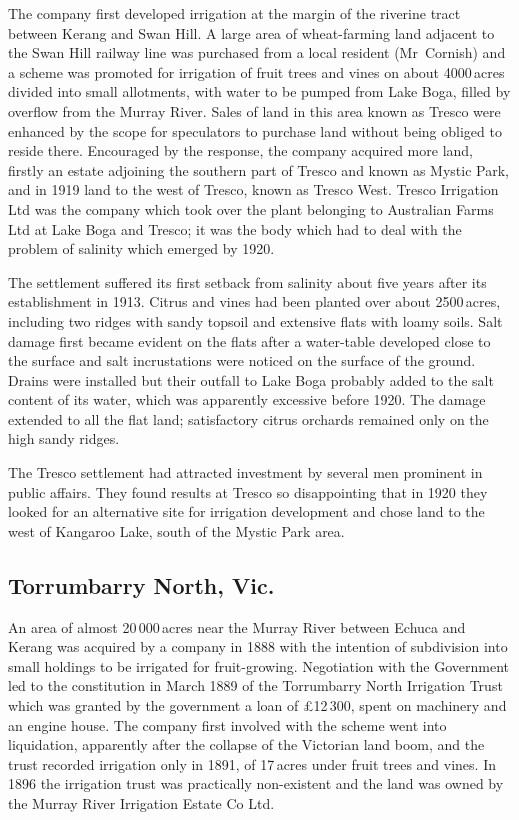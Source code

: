 The company first developed irrigation at the margin of the riverine
tract between Kerang and Swan Hill.  A large area of wheat-farming
land adjacent to the Swan Hill railway line was purchased from a local
resident (Mr~Cornish) and a scheme was promoted for irrigation of
fruit trees and vines on about 4000\,acres divided into small allotments,
with water to be pumped from Lake Boga, filled by overflow from the
Murray River.  Sales of land in this area known as Tresco were
enhanced by the scope for speculators to purchase land without being
obliged to reside there.  Encouraged by the response, the company
acquired more land, firstly an estate adjoining the southern part of
Tresco and known as Mystic Park, and in 1919 land to the west of
Tresco, known as Tresco West.  Tresco Irrigation Ltd was the company
which took over the plant belonging to Australian Farms Ltd at Lake
Boga and Tresco; it was the body which had to deal with the problem of
salinity which emerged by 1920.

The settlement suffered its first setback from salinity about five
years after its establishment in 1913.  Citrus and vines had been
planted over about 2500\,acres, including two ridges with sandy topsoil
and extensive flats with loamy soils.  Salt damage first became
evident on the flats after a water-table developed close to the
surface and salt incrustations were noticed on the surface of the
ground.  Drains were installed but their outfall to Lake Boga probably
added to the salt content of its water, which was apparently excessive
before 1920. The damage extended to all the flat land; satisfactory
citrus orchards remained only on the high sandy
ridges.

The Tresco settlement had attracted investment by several men
pro\-minent in public affairs.  They found results at Tresco so
disappointing that in 1920 they looked for an alternative site for
irrigation development and chose land to the west of Kangaroo Lake,
south of the Mystic Park area.

\subsection*{Torrumbarry North, Vic.}

An area of almost 20\,000\,acres near the Murray River between Echuca and
Kerang was acquired by a company in 1888 with the intention of
subdivision into small holdings to be irrigated for
fruit-growing.  Negotiation with the Government led to
the constitution in March 1889 of the Torrumbarry North Irrigation
Trust which was granted by the government a loan of
\pounds12\,300, spent on machinery and an engine house.  The company
first involved with the scheme went into liquidation, apparently after
the collapse of the Victorian land boom, and the trust recorded
irrigation only in 1891, of 17\,acres under fruit trees and vines.  In
1896 the irrigation trust was practically non-existent and the land
was owned by the Murray River Irrigation Estate Co Ltd.

